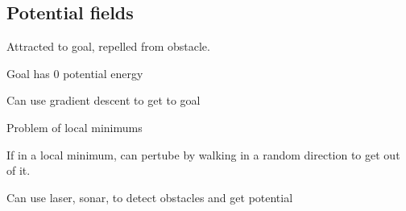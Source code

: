 
\subsection{Potential fields}

Attracted to goal, repelled from obstacle.

Goal has 0 potential energy

Can use gradient descent to get to goal

Problem of local minimums

If in a local minimum, can pertube by walking in a random direction to get out of it.

Can use laser, sonar, to detect obstacles and get potential


